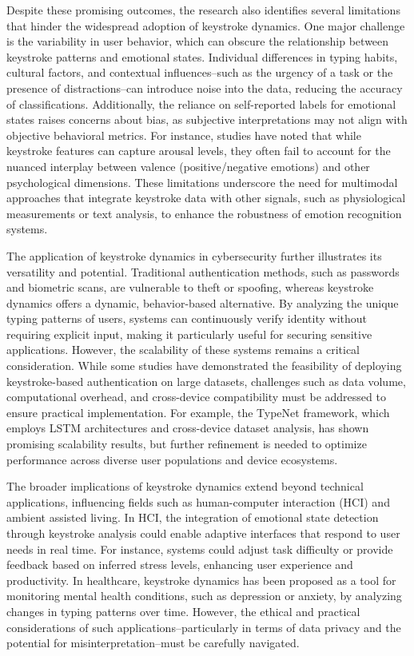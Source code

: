 \documentclass[conference]{IEEEtran}
\begin{document}
Despite these promising outcomes, the research also identifies several limitations that hinder the widespread adoption of keystroke dynamics. One major challenge is the variability in user behavior, which can obscure the relationship between keystroke patterns and emotional states. Individual differences in typing habits, cultural factors, and contextual influences--such as the urgency of a task or the presence of distractions--can introduce noise into the data, reducing the accuracy of classifications. Additionally, the reliance on self-reported labels for emotional states raises concerns about bias, as subjective interpretations may not align with objective behavioral metrics. For instance, studies have noted that while keystroke features can capture arousal levels, they often fail to account for the nuanced interplay between valence (positive/negative emotions) and other psychological dimensions. These limitations underscore the need for multimodal approaches that integrate keystroke data with other signals, such as physiological measurements or text analysis, to enhance the robustness of emotion recognition systems.  

The application of keystroke dynamics in cybersecurity further illustrates its versatility and potential. Traditional authentication methods, such as passwords and biometric scans, are vulnerable to theft or spoofing, whereas keystroke dynamics offers a dynamic, behavior-based alternative. By analyzing the unique typing patterns of users, systems can continuously verify identity without requiring explicit input, making it particularly useful for securing sensitive applications. However, the scalability of these systems remains a critical consideration. While some studies have demonstrated the feasibility of deploying keystroke-based authentication on large datasets, challenges such as data volume, computational overhead, and cross-device compatibility must be addressed to ensure practical implementation. For example, the TypeNet framework, which employs LSTM architectures and cross-device dataset analysis, has shown promising scalability results, but further refinement is needed to optimize performance across diverse user populations and device ecosystems.  

The broader implications of keystroke dynamics extend beyond technical applications, influencing fields such as human-computer interaction (HCI) and ambient assisted living. In HCI, the integration of emotional state detection through keystroke analysis could enable adaptive interfaces that respond to user needs in real time. For instance, systems could adjust task difficulty or provide feedback based on inferred stress levels, enhancing user experience and productivity. In healthcare, keystroke dynamics has been proposed as a tool for monitoring mental health conditions, such as depression or anxiety, by analyzing changes in typing patterns over time. However, the ethical and practical considerations of such applications--particularly in terms of data privacy and the potential for misinterpretation--must be carefully navigated.  
\end{document}
